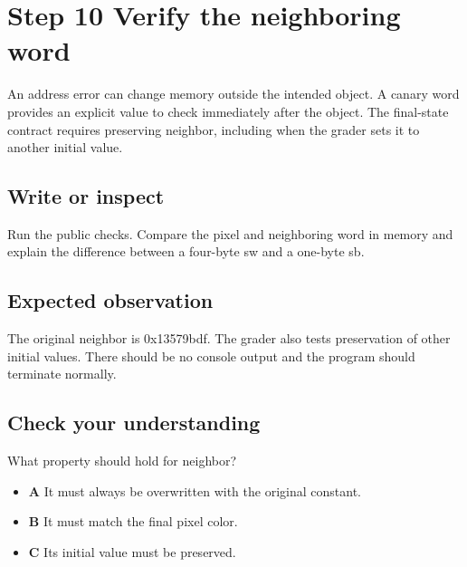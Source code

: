 \section{Step 10 Verify the neighboring
  word}\label{002-single-pixel-s10-step-10-verify-the-neighboring-word}

An address error can change memory outside the intended object. A canary
word provides an explicit value to check immediately after the object.
The final-state contract requires preserving neighbor, including when
the grader sets it to another initial value.

\subsection{Write or
  inspect}\label{002-single-pixel-s10-write-or-inspect}

Run the public checks. Compare the pixel and neighboring word in memory
and explain the difference between a four-byte sw and a one-byte sb.

\subsection{Expected
  observation}\label{002-single-pixel-s10-expected-observation}

The original neighbor is 0x13579bdf. The grader also tests preservation
of other initial values. There should be no console output and the
program should terminate normally.

\subsection{Check your
  understanding}\label{002-single-pixel-s10-check-your-understanding}

What property should hold for neighbor?

\begin{itemize}
  \tightlist
  \item
        \textbf{A} It must always be overwritten with the original constant.
  \item
        \textbf{B} It must match the final pixel color.
  \item
        \textbf{C} Its initial value must be preserved.
\end{itemize}
